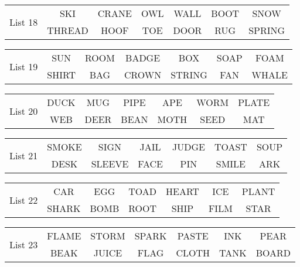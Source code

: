 \documentclass{article}
\begin{document}
\vspace{.1in}
\hspace{.5in}\begin{tabular}{r||c c c c c c }
\multirow{2}{*}{List 18} & SKI & CRANE & OWL & WALL & BOOT & SNOW\\
\cline{2-7}			& THREAD & HOOF & TOE & DOOR & RUG & SPRING\\
\end{tabular}

\vspace{.1in}
\hspace{.5in}\begin{tabular}{r||c c c c c c }
\multirow{2}{*}{List 19} & SUN & ROOM & BADGE & BOX & SOAP & FOAM\\
\cline{2-7}			& SHIRT & BAG & CROWN & STRING & FAN & WHALE\\
\end{tabular}

\vspace{.1in}
\hspace{.5in}\begin{tabular}{r||c c c c c c }
\multirow{2}{*}{List 20} & DUCK & MUG & PIPE & APE & WORM & PLATE\\
\cline{2-7}			& WEB & DEER & BEAN & MOTH & SEED & MAT\\
\end{tabular}

\vspace{.1in}
\hspace{.5in}\begin{tabular}{r||c c c c c c }
\multirow{2}{*}{List 21} & SMOKE & SIGN & JAIL & JUDGE & TOAST & SOUP\\
\cline{2-7}			& DESK & SLEEVE & FACE & PIN & SMILE & ARK\\
\end{tabular}

\vspace{.1in}
\hspace{.5in}\begin{tabular}{r||c c c c c c }
\multirow{2}{*}{List 22} & CAR & EGG & TOAD & HEART & ICE & PLANT\\
\cline{2-7}			& SHARK & BOMB & ROOT & SHIP & FILM & STAR\\
\end{tabular}

\vspace{.1in}
\hspace{.5in}\begin{tabular}{r||c c c c c c }
\multirow{2}{*}{List 23} & FLAME & STORM & SPARK & PASTE & INK & PEAR\\
\cline{2-7}			& BEAK & JUICE & FLAG & CLOTH & TANK & BOARD\\
\end{tabular}
\end{document}
